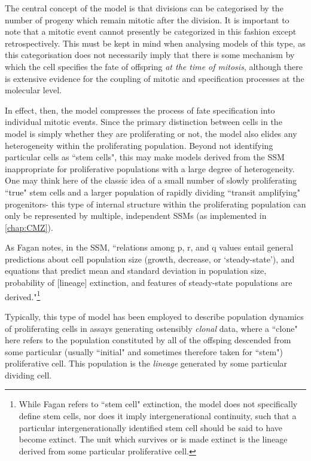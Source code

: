 The central concept of the model is that divisions can be categorised by the number of progeny which remain mitotic after the division. It is important to note that a mitotic event cannot presently be categorized in this fashion except retrospectively. This must be kept in mind when analysing models of this type, as this categorisation does not necessarily imply that there is some mechanism by which the cell specifies the fate of offspring \textit{at the time of mitosis}, although there is extensive evidence for the coupling of mitotic and specification processes at the molecular level.

In effect, then, the model compresses the process of fate specification into individual mitotic events. Since the primary distinction between cells in the model is simply whether they are proliferating or not, the model also elides any heterogeneity within the proliferating population. Beyond not identifying particular cells as ``stem cells", this may make models derived from the SSM inappropriate for proliferative populations with a large degree of heterogeneity. One may think here of the classic idea of a small number of slowly proliferating ``true" stem cells and a larger population of rapidly dividing ``transit amplifying" progenitors- this type of internal structure within the proliferating population can only be represented by multiple, independent SSMs (as implemented in \autoref{chap:CMZ}).

As Fagan notes, in the SSM, ``relations among p, r, and q values entail general predictions about cell population size (growth, decrease, or ‘steady-state’), and equations that predict mean and standard deviation in population size, probability of [lineage] extinction, and features of steady-state populations are derived."\footnote{While Fagan refers to ``stem cell" extinction, the model does not specifically define stem cells, nor does it imply intergenerational continuity, such that a particular intergenerationally identified stem cell should be said to have become extinct. The unit which survives or is made extinct is the lineage derived from some particular proliferative cell.}\cite[p.60]{Fagan2013}

Typically, this type of model has been employed to describe population dynamics of proliferating cells in assays generating ostensibly \textit{clonal} data, where a ``clone" here refers to the population constituted by all of the offsping descended from some particular (usually ``initial" and sometimes therefore taken for ``stem") proliferative cell. This population is the \textit{lineage} generated by some particular dividing cell.



